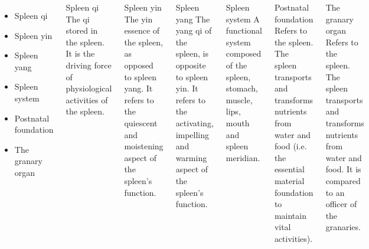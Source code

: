 \documentclass[
	11pt, %
]{beamer}
\theoremstyle{newblock}
\begin{document}
\begin{frame}
	\begin{columns}
	\end{columns}
\end{frame}





\begin{frame}
	\begin{columns}
		\column{0.3\textwidth}
		\begin{itemize}
			\item Spleen qi
			\item Spleen yin
			\item Spleen yang
			\item Spleen system 
			\item Postnatal foundation
			\item The granary organ 
		\end{itemize}
		\column{0.6\textwidth}
		\begin{block}{Spleen qi}
			The qi stored in the spleen. It is the driving force of 
physiological activities of the spleen.
		\end{block}
		\begin{block}{Spleen yin}
			The yin essence of the spleen, as opposed to spleen yang. It refers to the quiescent and moistening aspect of the spleen's function.
		\end{block}
		\begin{block}{Spleen yang}
			The yang qi of the spleen, is opposite to spleen yin. It refers to the activating, impelling and warming aspect of the spleen's function.

		\end{block}
		\begin{block}{Spleen system}
			A functional system composed of the spleen, stomach, muscle, lips, mouth and spleen meridian.
		\end{block}
		\begin{block}{Postnatal foundation}
			Refers to the spleen. The spleen transports and transforms nutrients from water and food (i.e. the essential material foundation to maintain vital activities).
		\end{block}
		\begin{block}{The granary organ}
			Refers to the spleen. The spleen transports and transforms nutrients from water and food. It is compared to an officer of the granaries. 
		\end{block}
	\end{columns}
\end{frame}
\end{document}
